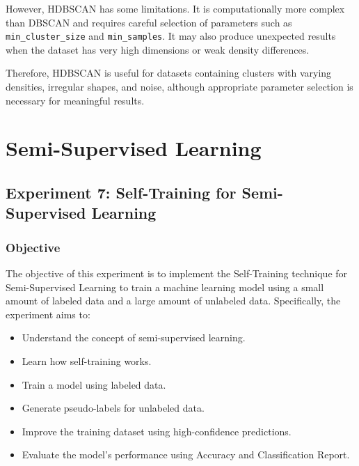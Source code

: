 \documentclass[a4paper,11pt]{article}
\begin{document}
However, HDBSCAN has some limitations. It is computationally more complex than DBSCAN and requires careful selection of parameters such as \texttt{min\_cluster\_size} and \texttt{min\_samples}. It may also produce unexpected results when the dataset has very high dimensions or weak density differences.

Therefore, HDBSCAN is useful for datasets containing clusters with varying densities, irregular shapes, and noise, although appropriate parameter selection is necessary for meaningful results.



\section{Semi-Supervised Learning}

\subsection{Experiment 7: Self-Training for Semi-Supervised Learning}

\subsubsection{Objective}
The objective of this experiment is to implement the Self-Training technique for Semi-Supervised Learning to train a machine learning model using a small amount of labeled data and a large amount of unlabeled data. Specifically, the experiment aims to:
\begin{itemize}
    \item Understand the concept of semi-supervised learning.
    \item Learn how self-training works.
    \item Train a model using labeled data.
    \item Generate pseudo-labels for unlabeled data.
    \item Improve the training dataset using high-confidence predictions.
    \item Evaluate the model's performance using Accuracy and Classification Report.
\end{itemize}
\end{document}
